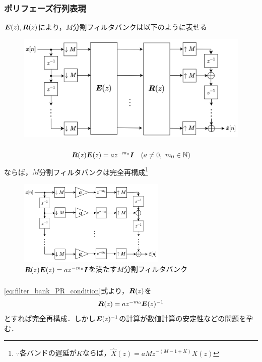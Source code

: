 \documentclass[14pt,xcolor=dvipsnames,table,dvipdfmx]{beamer}
\begin{document}
\begin{frame}[c]
    \frametitle{ポリフェーズ行列表現}
    $\boldsymbol{E}(z), \boldsymbol{R}(z)$により，$M$分割フィルタバンクは以下のように表せる
    \vspace{-13pt}
    \begin{figure}
        \includegraphics[width=120mm]{./figs/polyphase_representation_filter_bank.drawio.png}
    \end{figure}
\end{frame}

\begin{frame}[c]
    \frametitle{}
    \begin{block}{}
        \vspace{-14pt}
        \begin{align}
            \ve{R}(z) \ve{E}(z) = a z^{-m_{0}} \ve{I} \quad (a \neq 0,\ m_{0} \in \mathbb{N}) \label{eq:filter_bank_PR_condition}
        \end{align}
        ならば，$M$分割フィルタバンクは完全再構成\footnote{$\because$各バンドの遅延が$K$ならば，$\hat{X}(z) = aM z^{-(M - 1 + K)}X(z)$}
    \end{block}
    \begin{figure}
        \includegraphics[width=70mm]{./figs/perfect_reconstraction_filter_bank.drawio.png}
        \caption*{$\boldsymbol{R}(z) \boldsymbol{E}(z) = a z^{-m_{0}} \boldsymbol{I}$を満たす$M$分割フィルタバンク}
    \end{figure}
\end{frame}

\begin{frame}[c]
    \frametitle{}
    \eqref{eq:filter_bank_PR_condition}式より，$\boldsymbol{R}(z)$を
    \begin{align*}
        \boldsymbol{R}(z) = a z^{-m_{0}} \boldsymbol{E}(z)^{-1}
    \end{align*}
    とすれば完全再構成．しかし$\boldsymbol{E}(z)^{-1}$の計算が数値計算の安定性などの問題を孕む．
\end{frame}
\end{document}
